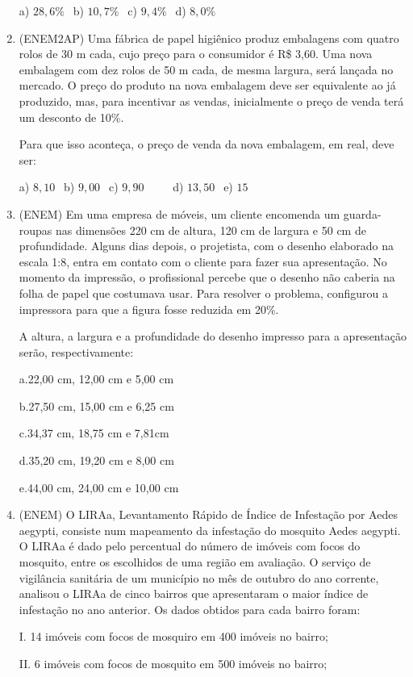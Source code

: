 \begin{multicols*}{2}
\begin{enumerate}
	a) $28,6\% \ \ $ b) $10,7\% \ \ $ c) $ 9,4\% \ \ $ d) $ 8,0\% $

	\item (ENEM2AP) Uma fábrica de papel higiênico produz embalagens com quatro rolos de 30 m cada, cujo preço
para o consumidor é R\$ 3,60. Uma nova embalagem com dez rolos de 50 m cada, de mesma largura, será lançada no
mercado. O preço do produto na nova embalagem deve ser equivalente ao já produzido, mas, para incentivar as
vendas, inicialmente o preço de venda terá um desconto de 10\%.

Para que isso aconteça, o preço de venda da nova embalagem, em real, deve ser:

	a) $8,10 \ \ $ b) $9,00 \ \ $ c) $9,90 \ \ \ \ \ \ \ \ \ \ $ d) $13,50 \ \ $ e) $15 \ \ $

	\item (ENEM) Em uma empresa de móveis, um cliente encomenda um guarda-roupas nas dimensões 220 cm de
altura, 120 cm de largura e 50 cm de profundidade. Alguns dias depois, o projetista, com o desenho elaborado na
escala 1:8, entra em contato com o cliente para fazer sua apresentação. No momento da impressão, o profissional
percebe que o desenho não caberia na folha de papel que costumava usar. Para resolver o problema, configurou a
impressora para que a figura fosse reduzida em 20\%.

A altura, a largura e a profundidade do desenho impresso para a apresentação serão, respectivamente:

a.22,00 cm, 12,00 cm e 5,00 cm

b.27,50 cm, 15,00 cm e 6,25 cm

c.34,37 cm, 18,75 cm e 7,81cm

d.35,20 cm, 19,20 cm e 8,00 cm

e.44,00 cm, 24,00 cm e 10,00 cm

	\item (ENEM) O LIRAa, Levantamento Rápido de Índice de Infestação por Aedes aegypti, consiste num mapeamento da infestação do mosquito Aedes aegypti. O LIRAa é dado pelo percentual do número de imóveis com focos do mosquito, entre os escolhidos de uma região em avaliação. O serviço de vigilância sanitária de um município no mês de outubro do ano corrente, analisou o LIRAa de cinco bairros que apresentaram o maior índice de infestação no ano anterior. Os dados obtidos para cada bairro foram:

I. 14 imóveis com focos de mosquiro em 400 imóveis no bairro;

II. 6 imóveis com focos de mosquito em 500 imóveis no bairro;


\end{enumerate}
\end{multicols*}
